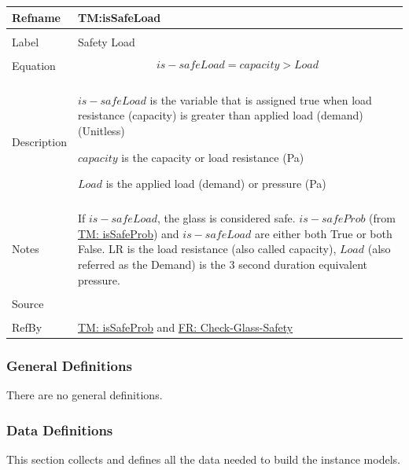 \documentclass[12pt]{article}
\begin{document}
\noindent \begin{minipage}{\textwidth}
\begin{tabular}{p{} p{}}
\toprule \textbf{Refname} & \textbf{TM:isSafeLoad}
\label{TM:isSafeLoad}
\\ \midrule \\
Label & Safety Load
\\ \midrule \\
Equation & \begin{displaymath}
           is-safeLoad=capacity>Load
           \end{displaymath}
\\ \midrule \\
Description & \begin{symbDescription}
              \item{$is-safeLoad$ is the variable that is assigned true when load resistance (capacity) is greater than applied load (demand) (Unitless)}
              \item{$capacity$ is the capacity or load resistance (Pa)}
              \item{$Load$ is the applied load (demand) or pressure (Pa)}
              \end{symbDescription}
\\ \midrule \\
Notes & If $is-safeLoad$, the glass is considered safe. $is-safeProb$ (from \hyperref[TM:isSafeProb]{TM: isSafeProb}) and $is-safeLoad$ are either both True or both False. LR is the load resistance (also called capacity), $Load$ (also referred as the Demand) is the 3 second duration equivalent pressure.
\\ \midrule \\
Source & \cite{astm2009}
\\ \midrule \\
RefBy & \hyperref[TM:isSafeProb]{TM: isSafeProb} and \hyperref[checkGlassSafety]{FR: Check-Glass-Safety}
\\ \bottomrule \end{tabular}
\end{minipage}
\subsubsection{General Definitions}
\label{Sec:GDs}
There are no general definitions.
\subsubsection{Data Definitions}
\label{Sec:DDs}
This section collects and defines all the data needed to build the instance models.
\par~
\end{document}
